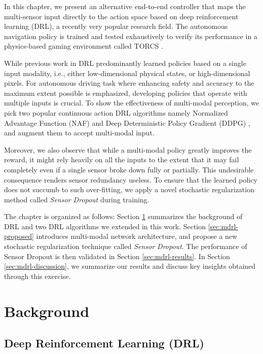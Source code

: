 \documentclass[../thesis.tex]{subfiles}
\begin{document}
In this chapter, we present an alternative end-to-end controller that maps the multi-sensor input directly to the action space based on deep reinforcement learning (DRL), a recently very popular research field. The autonomous navigation policy is trained and tested exhaustively to verify its performance in a physics-based gaming environment called TORCS \cite{wymann2000torcs}. 

While previous work in DRL predominantly learned policies based on a single input modality, i.e., either low-dimensional physical states, or high-dimensional pixels. For autonomous driving task where enhancing safety and accuracy to the maximum extent possible is emphasized, developing policies that operate with multiple inputs is crucial. To show the effectiveness of multi-modal perception, we pick two popular continuous action DRL algorithms namely Normalized Advantage Function (NAF) \cite{CDQN} and Deep Deterministic Policy Gradient (DDPG) \cite{DBLP:journals/corr/LillicrapHPHETS15}, and augment them to accept multi-modal input.

Moreover, we also observe that while a multi-modal policy greatly improves the reward, it might rely heavily on all the inputs to the extent that it may fail completely even if a single sensor broke down fully or partially. This undesirable consequence renders sensor redundancy useless. To ensure that the learned policy does not succumb to such over-fitting, we apply a novel stochastic regularization method called \emph{Sensor Dropout} during training. 

The chapter is organized as follows: Section \ref{sec:mdrl-background} summarizes the background of DRL and two DRL algorithms we extended in this work. Section \ref{sec:mdrl-proposed} introduces multi-modal network architecture, and propose a new stochastic regularization technique called \emph{Sensor Dropout}. The performance of Sensor Dropout is then validated in Section \ref{sec:mdrl-results}. In Section \ref{sec:mdrl-discussion}, we summarize our results and discuss key insights obtained through this exercise. 

\section{Background} \label{sec:mdrl-background}
\subsection{Deep Reinforcement Learning (DRL)}
\end{document}
